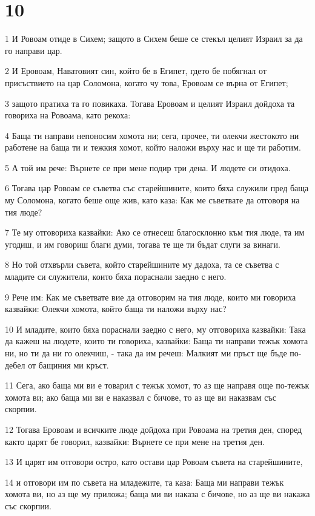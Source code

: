 \chapter{10}

\par 1 И Ровоам отиде в Сихем; защото в Сихем беше се стекъл целият Израил за да го направи цар.
\par 2 И Еровоам, Наватовият син, който бе в Египет, гдето бе побягнал от присъствието на цар Соломона, когато чу това, Еровоам се върна от Египет;
\par 3 защото пратиха та го повикаха. Тогава Еровоам и целият Израил дойдоха та говориха на Ровоама, като рекоха:
\par 4 Баща ти направи непоносим хомота ни; сега, прочее, ти олекчи жестокото ни работене на баща ти и тежкия хомот, който наложи върху нас и ще ти работим.
\par 5 А той им рече: Върнете се при мене подир три дена. И людете си отидоха.
\par 6 Тогава цар Ровоам се съветва със старейшините, които бяха служили пред баща му Соломона, когато беше още жив, като каза: Как ме съветвате да отговоря на тия люде?
\par 7 Те му отговориха казвайки: Ако се отнесеш благосклонно към тия люде, та им угодиш, и им говориш благи думи, тогава те ще ти бъдат слуги за винаги.
\par 8 Но той отхвърли съвета, който старейшините му дадоха, та се съветва с младите си служители, които бяха пораснали заедно с него.
\par 9 Рече им: Как ме съветвате вие да отговорим на тия люде, които ми говориха казвайки: Олекчи хомота, който баща ти наложи върху нас?
\par 10 И младите, които бяха пораснали заедно с него, му отговориха казвайки: Така да кажеш на людете, които ти говориха, казвайки: Баща ти направи тежък хомота ни, но ти да ни го олекчиш, - така да им речеш: Малкият ми пръст ще бъде по-дебел от бащиния ми кръст.
\par 11 Сега, ако баща ми ви е товарил с тежък хомот, то аз ще направя още по-тежък хомота ви; ако баща ми ви е наказвал с бичове, то аз ще ви наказвам със скорпии.
\par 12 Тогава Еровоам и всичките люде дойдоха при Ровоама на третия ден, според както царят бе говорил, казвайки: Върнете се при мене на третия ден.
\par 13 И царят им отговори остро, като остави цар Ровоам съвета на старейшините,
\par 14 и отговори им по съвета на младежите, та каза: Баща ми направи тежък хомота ви, но аз ще му приложа; баща ми ви наказа с бичове, но аз ще ви накажа със скорпии.
